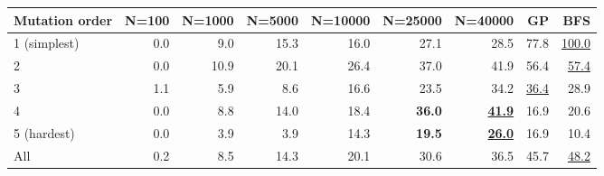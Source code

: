 \begin{tabular}{lrrrrrrrr}
\toprule
Mutation order & N=100 & N=1000 & N=5000 & N=10000 & N=25000 & N=40000 & GP & BFS \\
\midrule
1 (simplest) & 0.0 & 9.0 & 15.3 & 16.0 & 27.1 & 28.5 & 77.8 & \underline{100.0} \\
2 & 0.0 & 10.9 & 20.1 & 26.4 & 37.0 & 41.9 & 56.4 & \underline{57.4} \\
3 & 1.1 & 5.9 & 8.6 & 16.6 & 23.5 & 34.2 & \underline{36.4} & 28.9 \\
4 & 0.0 & 8.8 & 14.0 & 18.4 & \textbf{36.0} & \underline{\textbf{41.9}} & 16.9 & 20.6 \\
5 (hardest) & 0.0 & 3.9 & 3.9 & 14.3 & \textbf{19.5} & \underline{\textbf{26.0}} & 16.9 & 10.4 \\
\midrule
All & 0.2 & 8.5 & 14.3 & 20.1 & 30.6 & 36.5 & 45.7 & \underline{48.2} \\
\bottomrule
\end{tabular}
